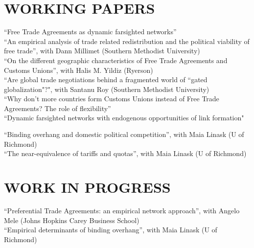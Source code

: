 \documentclass[11pt]{res}
\begin{document}
\begin{resume}
\section{WORKING PAPERS}\vspace{2mm}
{ ``Free Trade Agreements as dynamic farsighted networks''} \vspace{1.5mm}\\
{``An empirical analysis of trade related redistribution and the political viability of free trade''}, with Dann Millimet (Southern Methodist University)\vspace{1.5mm}\\
{``On the different geographic characteristics of Free Trade Agreements and Customs Unions''}, with Halis M. Yildiz (Ryerson)\vspace{1.5mm}\\
``Are global trade negotiations behind a fragmented world of ``gated globalization"?", with Santanu Roy (Southern Methodist University)\vspace{1.5mm}\\
{``Why don't more countries form Customs Unions instead of Free Trade Agreements? The role of flexibility''} \vspace{1.5mm}\\
{``Dynamic farsighted networks with endogenous opportunities of link formation"}\vspace{1.5mm}\\

\phantom{.}\vspace{.4cm}

{``Binding overhang and domestic political competition''}, with Maia Linask (U of Richmond)\vspace{1.5mm}\\
{``The near-equivalence of tariffs and quotas''}, with Maia Linask (U of Richmond)\vspace{1.5mm}\\

\section{WORK IN PROGRESS}\vspace{2mm}
``Preferential Trade Agreements: an empirical network approach'', with Angelo Mele (Johns Hopkins Carey Business School)\vspace{1.5mm}\\
``Empirical determinants of binding overhang'', with Maia Linask (U of Richmond)\vspace{1.5mm}\\


\end{resume}
\end{document}
